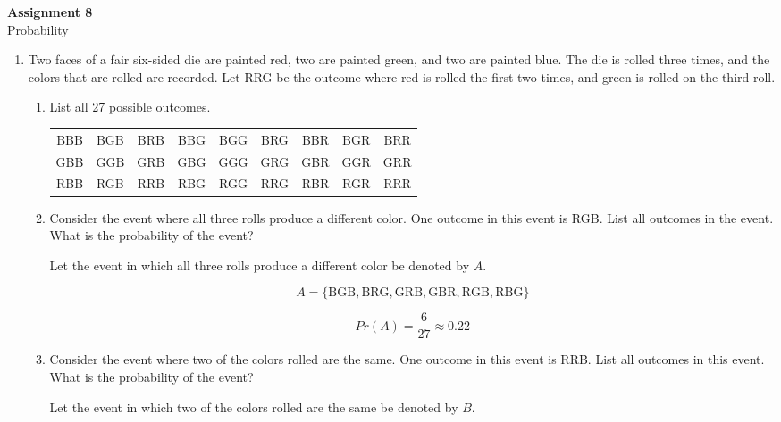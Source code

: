 \documentclass[11pt, letterpaper, includehead]{article}
\theoremstyle{plain}
\theoremstyle{mydefinition}
\theoremstyle{myproperty}
\begin{document}
 

\pagestyle{fancy}
\fancyhead{}
\fancyfoot{}


\begin{center}
    \Large{\textbf{Assignment 8}}\\
    \Large{Probability}
\end{center}

\begin{enumerate}[label=\textbf{\arabic*}., leftmargin=*]
\item Two faces of a fair six-sided die are painted red, two are painted green, and two are painted blue. The die is rolled three times, and the colors that are rolled are recorded. Let RRG be the outcome where red is rolled the first two times, and green is rolled on the third roll.
\begin{enumerate}[label=(\alph*)]
    \item List all 27 possible outcomes.
    \begin{center}
        \begin{tabular}{ccccccccc}
        BBB & BGB & BRB & BBG & BGG & BRG & BBR & BGR & BRR \\
        GBB & GGB & GRB & GBG & GGG & GRG & GBR & GGR & GRR \\
        RBB & RGB & RRB & RBG & RGG & RRG & RBR & RGR & RRR \\
        \end{tabular}
    \end{center}

    \item Consider the event where all three rolls produce a different color. One outcome in this event is RGB. List all outcomes in the event. What is the probability of the event?
   
    Let the event in which all three rolls produce a different color be denoted by $A$.

    \[A = \{\text{BGB}, \text{BRG}, \text{GRB}, \text{GBR}, \text{RGB}, \text{RBG}\}\]

    \[Pr(A) = \frac{6}{27} \approx 0.22\]

    \item Consider the event where two of the colors rolled are the same. One outcome in this event is RRB. List all outcomes in this event. What is the probability of the event?
    
    Let the event in which two of the colors rolled are the same be denoted by $B$.


\end{enumerate}
\end{enumerate}
\end{document}
